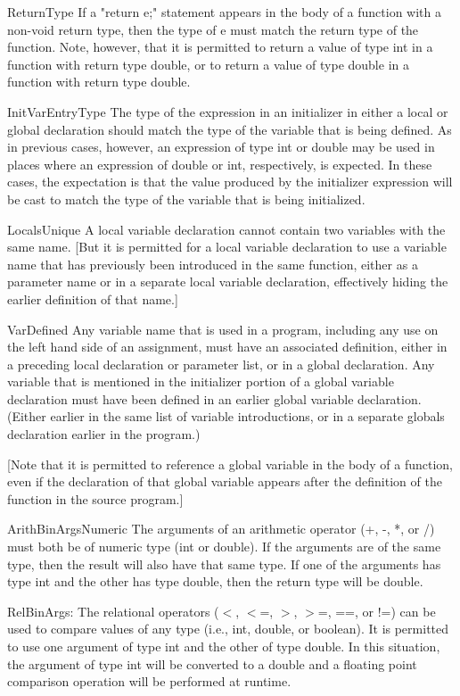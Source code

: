 \documentclass{article}
\begin{document}
ReturnType
  If a "return e;" statement appears in the body of a function
  with a non-void return type, then the type of e must match the
  return type of the function.  Note, however, that it is
  permitted to return a value of type int in a function
  with return type double, or to return a value of type double
  in a function with return type double.

InitVarEntryType
  The type of the expression in an initializer in either a local
  or global declaration should match the type of the variable that
  is being defined.  As in previous cases, however, an expression
  of type int or double may be used in places where an expression
  of double or int, respectively, is expected.  In these cases,
  the expectation is that the value produced by the initializer
  expression will be cast to match the type of the variable that
  is being initialized.

LocalsUnique
  A local variable declaration cannot contain two variables with
  the same name.  [But it is permitted for a local variable
  declaration to use a variable name that has previously been
  introduced in the same function, either as a parameter name or
  in a separate local variable declaration, effectively hiding the
  earlier definition of that name.]

VarDefined
  Any variable name that is used in a program, including any use
  on the left hand side of an assignment, must have an associated
  definition, either in a preceding local declaration or parameter
  list, or in a global declaration.  Any variable that is
  mentioned in the initializer portion of a global variable
  declaration must have been defined in an earlier global variable
  declaration.  (Either earlier in the same list of variable
  introductions, or in a separate globals declaration earlier in
  the program.)

  [Note that it is permitted to reference a global variable in the
  body of a function, even if the declaration of that global
  variable appears after the definition of the function in the
  source program.]

ArithBinArgsNumeric
  The arguments of an arithmetic operator (+, -, *, or /) must
  both be of numeric type (int or double).  If the arguments are
  of the same type, then the result will also have that same type.
  If one of the arguments has type int and the other has type
  double, then the return type will be double.

RelBinArgs:
  The relational operators ($<$, $<$=, $>$, $>$=, ==, or !=) can be used
  to compare values of any type (i.e., int, double, or boolean).
  It is permitted to use one argument of type int and the other
  of type double.  In this situation, the argument of type int
  will be converted to a double and a floating point comparison
  operation will be performed at runtime.
\end{document}

